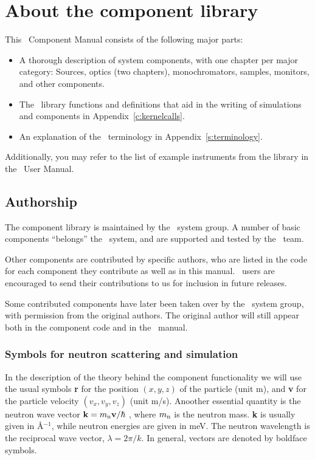 
\chapter{About the component library}
\label{c:components}
This \MCS\ Component Manual consists of the following major parts:
\begin{itemize}
\item A thorough description of system components, 
with one chapter per major category: Sources, optics (two chapters), 
monochromators, samples, monitors, and other components. 
\item The \MCS\ library functions and definitions
  that aid in the writing of simulations and components in
  Appendix~\ref{c:kernelcalls}.    
\item An explanation of the \MCS\ terminology in Appendix~\ref{s:terminology}.
\end{itemize}
Additionally, you may refer to the list of example instruments 
from the library in the \MCS\ User Manual.

\section{Authorship}
The component library is
maintained by the \MCS\ system group. A number of basic components
``belongs'' the \MCS\ system, and are supported and tested by the \MCS\
team.

Other components are contributed
by specific authors, who are listed in the code for each component
they contribute as well as in this manual.
\MCS\ users are encouraged to send their
contributions to us for inclusion in future releases.

Some contributed components have later been taken over by the \MCS\ system
group, with permission from the original authors. 
The original author will still appear both in the component code and in the
\MCS\ manual.

\subsection{Symbols for neutron scattering and simulation}
In the description of the theory behind the component functionality
we will use the usual symbols {\bf r} for the position
$(x,y,z)$ of the particle (unit m), and {\bf v} for
the particle velocity $(v_x, v_y, v_z)$ (unit m/s).
Anoother essential quantity is the neutron wave vector 
${\bf k} = m_{\rm n} {\bf v}/\hbar$ , where
$m_{\rm n}$ is the neutron mass. {\bf k} is usually given in
\AA$^{-1}$, while neutron energies are given in meV.
The neutron wavelength is the reciprocal wave vector,
$\lambda=2 \pi / k$.
In general, vectors are denoted by boldface symbols.

